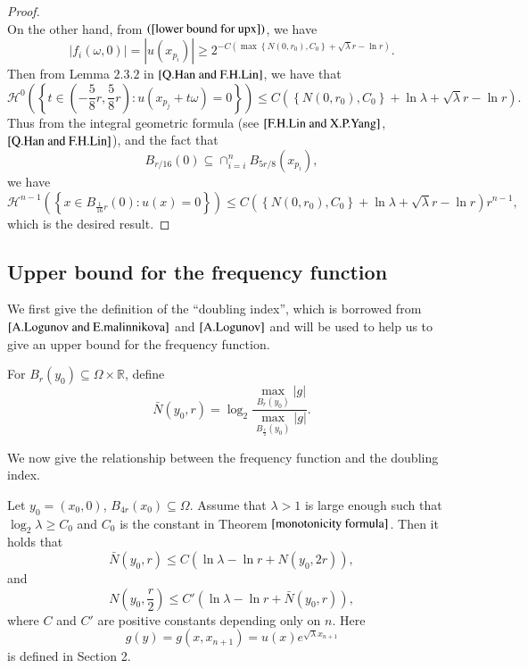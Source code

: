 \documentclass[a4paper, 12pt, onecolumn]{article} \textwidth 148mm
\begin{document}
\begin{proof}
$$$$
On the other hand,
from $(\ref{lower bound for upx})$, we have
$$
|f_i(\omega,0)|=|u(x_{p_i})|\geq2^{-C(\max\left\{N(0,r_0),C_0\right\}+\sqrt{\lambda}r-\ln r)}.
$$
Then from Lemma $2.3.2$ in $\cite{Q.Han and F.H.Lin}$,
we have that
\begin{equation}\label{upper bound of nodal set on one dimension}
\mathcal{H}^0\left(\left\{t\in(-\frac{5}{8}r,\frac{5}{8}r):u(x_{p_j}+t\omega)=0\right\}\right)\leq C\left(\left\{N(0,r_0),C_0\right\}+\ln\lambda+\sqrt{\lambda}r-\ln r\right).
\end{equation}
Thus from the integral geometric formula (see $\cite{F.H.Lin and X.P.Yang}$, $\cite{Q.Han and F.H.Lin}$), and the
fact that $$B_{r/16}(0)\subseteq\cap_{i=i}^nB_{5r/8}(x_{p_i}),$$ we have
\begin{equation}
\mathcal{H}^{n-1}\left(\left\{x\in B_{\frac{1}{16}r}(0):u(x)=0\right\}\right)
\leq C\left(\left\{N(0,r_0),C_0\right\}+\ln\lambda+\sqrt{\lambda}r-\ln r\right)r^{n-1},
\end{equation}
which is the desired result.
\end{proof}



\subsection{Upper bound for the frequency function}

We first give the definition of the ``doubling index'', which is borrowed from $\cite{A.Logunov and E.malinnikova}$ and $\cite{A.Logunov}$  and will be used to help us to give an upper bound for the frequency function.
\begin{definition}\label{definition of doubling index}
For $B_r(y_0)\subseteq\Omega\times\mathbb{R}$, define
\begin{equation}\label{another definition of frequency function}
\bar{N}(y_0,r)=\log_2\frac{\max\limits_{B_r(y_0)}|g|}{\max\limits_{B_{\frac{r}{2}}(y_0)}|g|}.
\end{equation}
\end{definition}

We now give the relationship between the frequency function and the doubling index.

\begin{lemma}\label{relation of two kind frequency}
Let $y_0=(x_0,0)$, $B_{4r}(x_0)\subseteq\Omega$. Assume that $\lambda>1$ is large enough such that $\log_2\lambda\geq C_0$ and $C_0$ is the constant in Theorem $\ref{monotonicity formula}$. Then it holds that
\begin{equation}
\bar{N}(y_0,r)\leq C\left(\ln\lambda-\ln r+N(y_0,2r)\right),
\end{equation}
and
\begin{equation}
N(y_0,\frac{r}{2})\leq C'\left(\ln\lambda-\ln r+\bar{N}(y_0,r)\right),
\end{equation}
where $C$ and $C'$ are positive constants depending only on $n$. Here $$g(y)=g(x,x_{n+1})=u(x)e^{\sqrt{\lambda}x_{n+1}}$$
is defined in Section 2.
\end{lemma}
\end{document}
